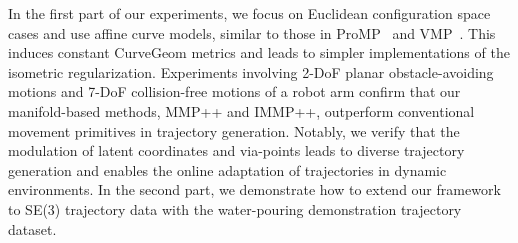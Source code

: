 In the first part of our experiments, we focus on Euclidean configuration space cases and use affine curve models, similar to those in ProMP~\cite{paraschos2013probabilistic} and VMP~\cite{zhou2019learning}. This induces constant CurveGeom metrics and leads to simpler implementations of the isometric regularization. Experiments involving 2-DoF planar obstacle-avoiding motions and 7-DoF collision-free motions of a robot arm confirm that our manifold-based methods, MMP++ and IMMP++, outperform conventional movement primitives in trajectory generation. Notably, we verify that the modulation of latent coordinates and via-points leads to diverse trajectory generation and enables the online adaptation of trajectories in dynamic environments.  In the second part, we demonstrate how to extend our framework to SE(3) trajectory data with the water-pouring demonstration trajectory dataset.